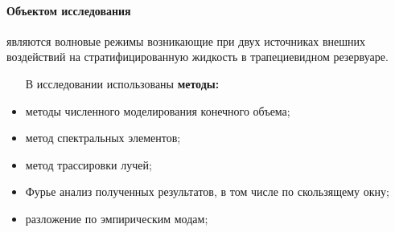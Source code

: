 \documentclass[utf8x]{G7-32} %
\begin{document}
\paragraph{Объектом исследования} являются волновые режимы возникающие 
при двух источниках внешних воздействий на стратифицированную жидкость в трапециевидном резервуаре.


\begin{itemize}
  \item [    В исследовании использованы \textbf{
методы:}]
  \item методы численного моделирования конечного объема;
  \item метод спектральных элементов;
  \item метод трассировки лучей;
  \item Фурье анализ полученных результатов, в том числе по скользящему окну;
  \item разложение по эмпирическим модам;
\end{itemize}

\end{document}
